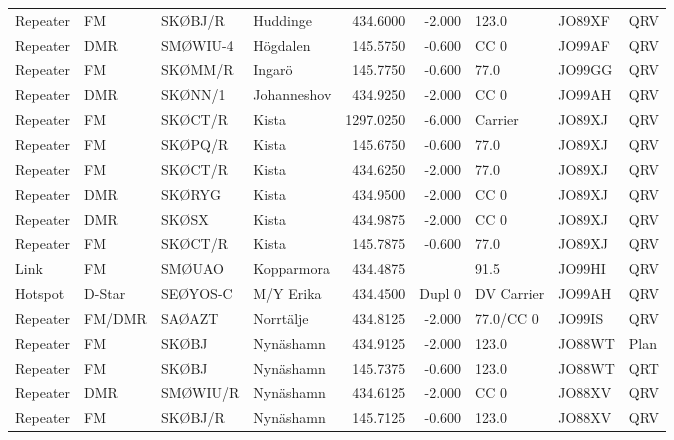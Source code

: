 \begin{longtable}{llllrrlll}
Repeater & FM          & SKØBJ/R  & Huddinge    & 434.6000     & -2.000     & 123.0      & JO89XF      & QRV      \\
Repeater & DMR         & SMØWIU-4 & Högdalen    & 145.5750     & -0.600     & CC 0       & JO99AF      & QRV      \\
Repeater & FM          & SKØMM/R  & Ingarö      & 145.7750     & -0.600     & 77.0       & JO99GG      & QRV      \\
Repeater & DMR         & SKØNN/1  & Johanneshov & 434.9250     & -2.000     & CC 0       & JO99AH      & QRV      \\
Repeater & FM          & SKØCT/R  & Kista       & 1297.0250    & -6.000     & Carrier    & JO89XJ      & QRV      \\
Repeater & FM          & SKØPQ/R  & Kista       & 145.6750     & -0.600     & 77.0       & JO89XJ      & QRV      \\
Repeater & FM          & SKØCT/R  & Kista       & 434.6250     & -2.000     & 77.0       & JO89XJ      & QRV      \\
Repeater & DMR         & SKØRYG   & Kista       & 434.9500     & -2.000     & CC 0       & JO89XJ      & QRV      \\
Repeater & DMR         & SKØSX    & Kista       & 434.9875     & -2.000     & CC 0       & JO89XJ      & QRV      \\
Repeater & FM          & SKØCT/R  & Kista       & 145.7875     & -0.600     & 77.0       & JO89XJ      & QRV      \\
Link     & FM          & SMØUAO   & Kopparmora  & 434.4875     &            & 91.5       & JO99HI      & QRV      \\
Hotspot  & D-Star      & SEØYOS-C & M/Y Erika   & 434.4500     & Dupl 0     & DV Carrier & JO99AH      & QRV      \\
Repeater & FM/DMR      & SAØAZT   & Norrtälje   & 434.8125     & -2.000     & 77.0/CC 0  & JO99IS      & QRV      \\
Repeater & FM          & SKØBJ    & Nynäshamn   & 434.9125     & -2.000     & 123.0      & JO88WT      & Plan     \\
Repeater & FM          & SKØBJ    & Nynäshamn   & 145.7375     & -0.600     & 123.0      & JO88WT      & QRT      \\
Repeater & DMR         & SMØWIU/R & Nynäshamn   & 434.6125     & -2.000     & CC 0       & JO88XV      & QRV      \\
Repeater & FM          & SKØBJ/R  & Nynäshamn   & 145.7125     & -0.600     & 123.0      & JO88XV      & QRV      \\

\end{longtable}
